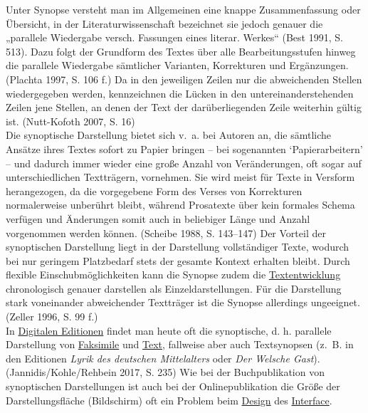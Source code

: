 \documentclass{article}
\begin{document}
    Unter Synopse versteht man im Allgemeinen eine knappe Zusammenfassung oder Übersicht, in der Literaturwissenschaft bezeichnet sie jedoch genauer die „parallele Wiedergabe versch. Fassungen eines literar. Werkes“ (Best 1991, S. 513). Dazu folgt der Grundform des Textes über alle Bearbeitungsstufen hinweg die parallele Wiedergabe sämtlicher Varianten, Korrekturen und Ergänzungen. (Plachta 1997, S. 106 f.) Da in den jeweiligen Zeilen nur die abweichenden Stellen wiedergegeben werden, kennzeichnen die Lücken in den untereinanderstehenden Zeilen jene Stellen, an denen der Text der darüberliegenden Zeile weiterhin gültig ist. (Nutt-Kofoth 2007, S. 16)\\
            
        Die synoptische Darstellung bietet sich v. a. bei Autoren an, die sämtliche Ansätze ihres Textes sofort zu Papier bringen – bei sogenannten ‘Papierarbeitern’ – und dadurch immer wieder eine große Anzahl von Veränderungen, oft sogar auf unterschiedlichen Textträgern, vornehmen. Sie wird meist für Texte in Versform herangezogen, da die vorgegebene Form des Verses von Korrekturen normalerweise unberührt bleibt, während Prosatexte über kein formales Schema verfügen und Änderungen somit auch in beliebiger Länge und Anzahl vorgenommen werden können. (Scheibe 1988, S. 143–147) Der Vorteil der synoptischen Darstellung liegt in der Darstellung vollständiger Texte, wodurch bei nur geringem Platzbedarf stets der gesamte Kontext erhalten bleibt. Durch flexible Einschubmöglichkeiten kann die Synopse zudem die \href{http://gams.uni-graz.at/o:konde.28}{Textentwicklung} chronologisch genauer darstellen als Einzeldarstellungen. Für die Darstellung stark voneinander abweichender Textträger ist die Synopse allerdings ungeeignet. (Zeller 1996, S. 99 f.)\\
            
        In \href{http://gams.uni-graz.at/o:konde.59}{Digitalen Editionen} findet man heute oft die synoptische, d. h. parallele Darstellung von \href{http://gams.uni-graz.at/o:konde.83}{Faksimile} und \href{http://gams.uni-graz.at/o:konde.75}{Text}, fallweise aber auch Textsynopsen (z. B. in den Editionen \emph{Lyrik des deutschen Mittelalters} oder \emph{Der Welsche Gast}). (Jannidis/Kohle/Rehbein 2017, S. 235) Wie bei der Buchpublikation von synoptischen Darstellungen ist auch bei der Onlinepublikation die Größe der Darstellungsfläche (Bildschirm) oft ein Problem beim \href{http://gams.uni-graz.at/o:konde.56}{Design} des \href{http://gams.uni-graz.at/o:konde.98}{Interface}.\\
            
\end{document}
